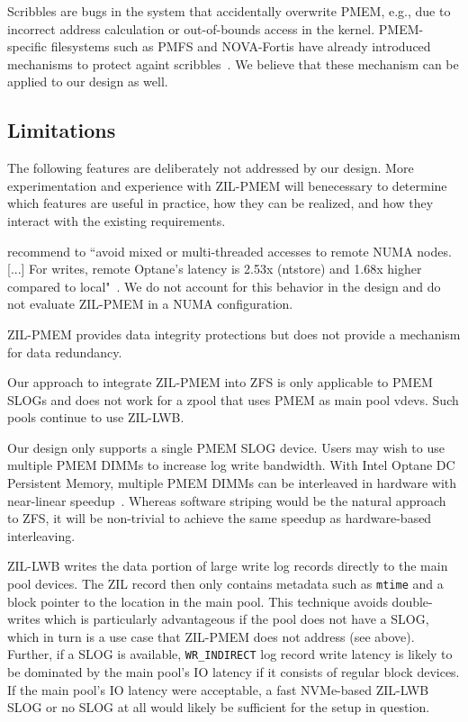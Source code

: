 \documentclass[12pt,a4paper,twoside]{book}
\begin{document}
Scribbles are bugs in the system that accidentally overwrite PMEM, e.g., due to incorrect address calculation or out-of-bounds access in the kernel.
PMEM-specific filesystems such as PMFS and NOVA-Fortis have already introduced mechanisms to protect againt scribbles~\cite{dulloorSystemSoftwarePersistent2014,xuNOVAFortisFaulttolerantNonvolatile2017}.
We believe that these mechanism can be applied to our design as well.

\subsection{Limitations}
The following features are deliberately not addressed by our design.
More experimentation and experience with ZIL-PMEM will benecessary to determine which features are useful in practice, how they can be realized, and how they interact with the existing requirements.

\citeauthor{yangEmpiricalGuideBehavior2020} recommend to ``avoid mixed or multi-threaded accesses to remote NUMA nodes. [...]  For writes, remote Optane’s latency is 2.53x (ntstore) and 1.68x higher compared to local"~\cite{yangEmpiricalGuideBehavior2020}.
We do not account for this behavior in the design and do not evaluate ZIL-PMEM in a NUMA configuration.

ZIL-PMEM provides data integrity protections but does not provide a mechanism for data redundancy.

Our approach to integrate ZIL-PMEM into ZFS is only applicable to PMEM SLOGs and does not work for a zpool that uses PMEM as main pool vdevs.
Such pools continue to use ZIL-LWB.

Our design only supports a single PMEM SLOG device.
Users may wish to use multiple PMEM DIMMs to increase log write bandwidth.
With Intel Optane DC Persistent Memory, multiple PMEM DIMMs can be interleaved in hardware with near-linear speedup~\cite{yangEmpiricalGuideBehavior2020}.
Whereas software striping would be the natural approach to ZFS, it will be non-trivial to achieve the same speedup as hardware-based interleaving.

ZIL-LWB writes the data portion of large write log records directly to the main pool devices.
The ZIL record then only contains metadata such as \lstinline{mtime} and a block pointer to the location in the main pool.
This technique avoids double-writes which is particularly advantageous if the pool does not have a SLOG, which in turn is a use case that ZIL-PMEM does not address (see above).
Further, if a SLOG is available, \lstinline{WR_INDIRECT} log record write latency is likely to be dominated by the main pool's IO latency if it consists of regular block devices.
If the main pool's IO latency were acceptable, a fast NVMe-based ZIL-LWB SLOG or no SLOG at all would likely be sufficient for the setup in question.
\end{document}
